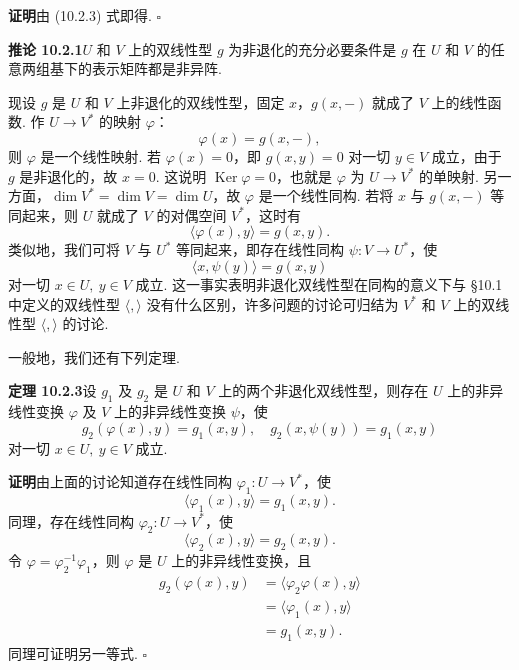\documentclass[UTF8,12pt,a4paper,fontset=fandol]{ctexart}
\begin{document}
\noindent\textbf{证明}\quad 由 (10.2.3) 式即得. $\square$

\noindent\textbf{推论 10.2.1}\quad $U$ 和 $V$ 上的双线性型 $g$ 为非退化的充分必要条件是 $g$ 在 $U$ 和 $V$ 的任意两组基下的表示矩阵都是非异阵.

现设 $g$ 是 $U$ 和 $V$ 上非退化的双线性型，固定 $x$，$g(x,-)$ 就成了 $V$ 上的线性函数. 作 $U\to V^*$ 的映射 $\varphi$：
\[
  \varphi(x)=g(x,-),
\]
则 $\varphi$ 是一个线性映射. 若 $\varphi(x)=0$，即 $g(x,y)=0$ 对一切 $y\in V$ 成立，由于 $g$ 是非退化的，故 $x=0$. 这说明 $\operatorname{Ker}\varphi=0$，也就是 $\varphi$ 为 $U\to V^*$ 的单映射. 另一方面，$\dim V^*=\dim V=\dim U$，故 $\varphi$ 是一个线性同构. 若将 $x$ 与 $g(x,-)$ 等同起来，则 $U$ 就成了 $V$ 的对偶空间 $V^*$，这时有
\[
  \langle\varphi(x),y\rangle=g(x,y).
\]
类似地，我们可将 $V$ 与 $U^*$ 等同起来，即存在线性同构 $\psi:V\to U^*$，使
\[
  \langle x,\psi(y)\rangle=g(x,y)
\]
对一切 $x\in U,\ y\in V$ 成立. 这一事实表明非退化双线性型在同构的意义下与 §10.1 中定义的双线性型 $\langle,\rangle$ 没有什么区别，许多问题的讨论可归结为 $V^*$ 和 $V$ 上的双线性型 $\langle,\rangle$ 的讨论.

一般地，我们还有下列定理.

\noindent\textbf{定理 10.2.3}\quad 设 $g_1$ 及 $g_2$ 是 $U$ 和 $V$ 上的两个非退化双线性型，则存在 $U$ 上的非异线性变换 $\varphi$ 及 $V$ 上的非异线性变换 $\psi$，使
\[
  g_2(\varphi(x),y)=g_1(x,y),\quad g_2(x,\psi(y))=g_1(x,y)
\]
对一切 $x\in U,\ y\in V$ 成立.

\noindent\textbf{证明}\quad 由上面的讨论知道存在线性同构 $\varphi_1:U\to V^*$，使
\[
  \langle\varphi_1(x),y\rangle=g_1(x,y).
\]
同理，存在线性同构 $\varphi_2:U\to V^*$，使
\[
  \langle\varphi_2(x),y\rangle=g_2(x,y).
\]
令 $\varphi=\varphi_2^{-1}\varphi_1$，则 $\varphi$ 是 $U$ 上的非异线性变换，且
\[
\begin{aligned}
  g_2(\varphi(x),y)&=\langle\varphi_2\varphi(x),y\rangle\\
  &=\langle\varphi_1(x),y\rangle\\
  &=g_1(x,y).
\end{aligned}
\]
同理可证明另一等式. $\square$
\end{document}

